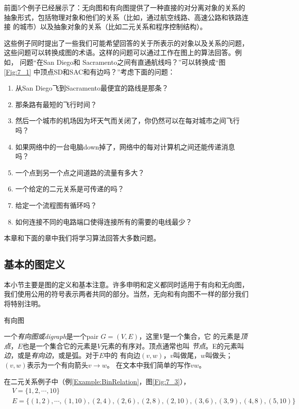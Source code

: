 前面5个例子已经展示了：无向图和有向图提供了一种直接的对分离对象的关系的
抽象形式，包括物理对象和他们的关系（比如，通过航空线路、高速公路和铁路连接
的城市）以及抽象对象的关系（比如二元关系和程序控制结构）。

这些例子同时提出了一些我们可能希望回答的关于所表示的对象以及关系的问题，
这些问题可以转换成图的术语。这样的问题可以通过工作在图上的算法回答。例如，
问题“在San Diego和 Sacramento之间有直通航线吗？”可以转换成“图\ref{Fig:7_1}
中顶点SD和SAC和有边吗？”考虑下面的问题：
\begin{enumerate}
\item 从San Diego飞到Sacramento最便宜的路线是那条？
\item 那条路有最短的飞行时间？
\item 然后一个城市的机场因为坏天气而关闭了，你仍然可以在每对城市之间飞行吗？
\item 如果网络中的一台电脑down掉了，网络中的每对计算机之间还能传递消息吗？
\item 一个点到另一个点之间道路的流量有多大？
\item 一个给定的二元关系是可传递的吗？
\item 给定一个流程图有循环吗？
\item 如何连接不同的电路端口使得连接所有的需要的电线最少？
\end{enumerate}
本章和下面的章中我们将学习算法回答大多数问题。

\subsection{基本的图定义}
本小节主要是图的定义和基本注意。许多申明和定义都同时适用于有向和无向图，
我们使用公用的符号表示两者共同的部分。当然，无向和有向图不一样的部分我们
将特别注明。

\begin{definition}
有向图

一个\emph{有向图或digraph}是一个pair $G=(V,E)$，这里$V$是一个集合，它
的元素是\emph{顶点}，$E$也是一个集合它的元素是$V$元素的有序对。顶点通常也叫
\emph{节点}。E的元素叫\emph{边}，或是\emph{有向边}，或是弧。对于$E$中的
有向边$(v, w)$，$v$叫做尾，$w$叫做头；$(v,w)$表示为一个有向箭头$v \rightarrow w$。
在文本中我们简单的写作$vw$。
\end{definition}

在二元关系例子中（例\ref{Example:BinRelation}，图\ref{Fig:7_3}），
\begin{displaymath}
\begin{aligned}
&V=\{1,2, \cdots, 10\}\\
&E=\{(1,2), \cdots, (1,10), (2,4),(2,6), (2,8),
(2,10),(3,6),(3,9),(4,8),(5,10)\}
\end{aligned}
\end{displaymath}

